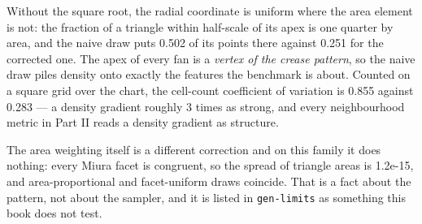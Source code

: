 \documentclass[
  british,
  a4paper,
]{book}
\newenvironment{Shaded}{\begin{snugshade}}{\end{snugshade}}
\newcommand{\AttributeTok}[1]{\textcolor[rgb]{0.13,0.29,0.53}{#1}}
\newcommand{\ConstantTok}[1]{\textcolor[rgb]{0.56,0.35,0.01}{#1}}
\newcommand{\DataTypeTok}[1]{\textcolor[rgb]{0.13,0.29,0.53}{#1}}
\newcommand{\DecValTok}[1]{\textcolor[rgb]{0.00,0.00,0.81}{#1}}
\newcommand{\FloatTok}[1]{\textcolor[rgb]{0.00,0.00,0.81}{#1}}
\newcommand{\FunctionTok}[1]{\textcolor[rgb]{0.13,0.29,0.53}{\textbf{#1}}}
\newcommand{\NormalTok}[1]{#1}
\newcommand{\OtherTok}[1]{\textcolor[rgb]{0.56,0.35,0.01}{#1}}
\newcommand{\SpecialCharTok}[1]{\textcolor[rgb]{0.81,0.36,0.00}{\textbf{#1}}}
\begin{document}
\begin{Shaded}
\end{Shaded}

Without the square root, the radial coordinate is uniform where the area element
is not: the fraction of a triangle within half-scale of its apex is one quarter
by area, and the naive draw puts 0.502 of its points
there against 0.251 for the corrected one. The apex of
every fan is a \emph{vertex of the crease pattern}, so the naive draw piles density
onto exactly the features the benchmark is about. Counted on a square grid over
the chart, the cell-count coefficient of variation is
0.855 against 0.283 --- a density
gradient roughly 3 times as strong, and
every neighbourhood metric in Part II reads a density gradient as structure.

The area weighting itself is a different correction and on this family it does
nothing: every Miura facet is congruent, so the spread of triangle areas is
1.2e-15, and area-proportional
and facet-uniform draws coincide. That is a fact about the pattern, not about the sampler, and it is
listed in \texttt{gen-limits} as something this book does not test.
\end{document}
